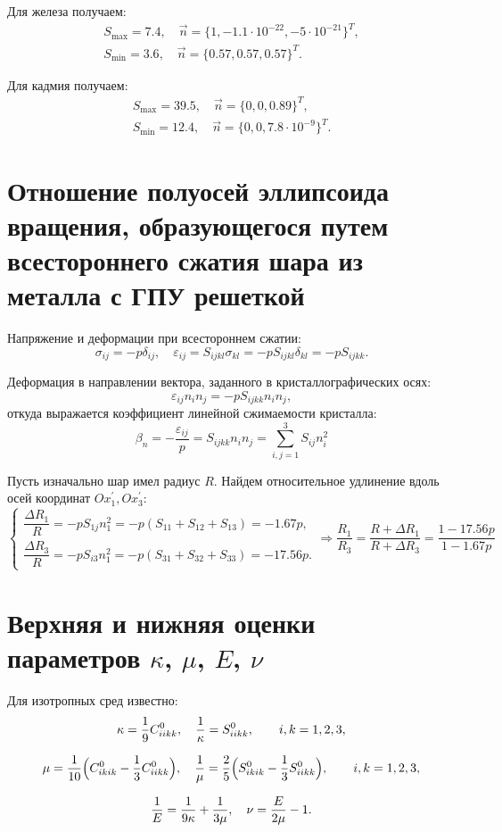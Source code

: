 \documentclass[12pt,a4paper]{article}
\begin{document}
Для железа получаем:
\begin{gather*}
    S_{\max} = 7.4, \quad \vec n = \{ 1, -1.1 \cdot 10^{-22}, -5 \cdot 10^{-21} \}^T, \\
    S_{\min} = 3.6, \quad \vec n = \{ 0.57, 0.57, 0.57 \}^T.
\end{gather*}

Для кадмия получаем:
\begin{gather*}
    S_{\max} = 39.5, \quad \vec n = \{ 0, 0, 0.89 \}^T, \\
    S_{\min} = 12.4, \quad \vec n = \{ 0, 0, 7.8 \cdot 10^{-9} \}^T.
\end{gather*}

 \section{Отношение полуосей эллипсоида вращения, образующегося путем всестороннего сжатия шара из металла с ГПУ решеткой}

 Напряжение и деформации при всестороннем сжатии:
 \[
   \sigma_{ij} = - p \delta_{ij}, \quad \varepsilon_{ij} = S_{ijkl} \sigma_{kl} = -p S_{ijkl} \delta_{kl} = -p S_{ijkk}.
 \]

 Деформация в направлении вектора, заданного в кристаллографических осях:
 \[
    \varepsilon_{ij} n_i n_j = -p S_{ijkk} n_i n_j,
 \]  
 \noindent откуда выражается коэффициент линейной сжимаемости кристалла:
 \[
    \beta_n = - \dfrac{\varepsilon_{ij}}{p} = S_{ijkk} n_i n_j = \sum \limits_{i, j = 1}^{3} S_{ij} n_i^2
 \]

 Пусть изначально шар имел радиус $R$. Найдем относительное удлинение вдоль осей координат $Ox_1^', Ox_3^'\colon$
 \[
    \begin{cases}
        \dfrac{\Delta R_1}{R} = -p S_{1j} n_1^2 = -p (S_{11} + S_{12} + S_{13}) = -1.67p, \\[0.7em]
        \dfrac{\Delta R_3}{R} = -p S_{i3} n_1^2 = -p (S_{31} + S_{32} + S_{33}) = -17.56p.
    \end{cases} \Rightarrow \dfrac{R_1}{R_3} = \dfrac{R + \Delta R_1}{R + \Delta R_3} = \dfrac{1 - 17.56p}{1 - 1.67p}
 \]

 \section{Верхняя и нижняя оценки параметров $\kappa$, $\mu$, $E$, $\nu$}

 Для изотропных сред известно:
 \begin{gather*}
    \kappa = \dfrac{1}{9}C^0_{iikk}, \quad \dfrac{1}{\kappa} = S^0_{iikk}, \qquad i, k = 1, 2, 3,
    \\[0.7em]
    \mu = \dfrac{1}{10}\Bigl( C^0_{ikik} - \dfrac{1}{3}C^0_{iikk} \Bigr), \quad \dfrac{1}{\mu} = \dfrac{2}{5}\Bigl( S^0_{ikik} - \dfrac{1}{3} S^0_{iikk} \Bigr), \qquad i, k = 1, 2, 3,
    \\[0.7em]
    \dfrac{1}{E} = \dfrac{1}{9 \kappa} + \dfrac{1}{3\mu}, \quad \nu = \dfrac{E}{2\mu} - 1.
 \end{gather*}
\end{document}
